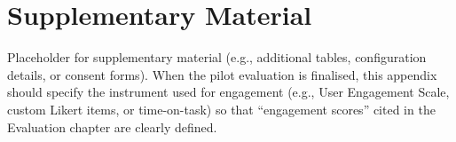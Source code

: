 \chapter{Supplementary Material}\label{app:supp}

Placeholder for supplementary material (e.g., additional tables, configuration details, or consent forms). When the pilot evaluation is finalised, this appendix should specify the instrument used for engagement (e.g., User Engagement Scale, custom Likert items, or time-on-task) so that ``engagement scores'' cited in the Evaluation chapter are clearly defined.
